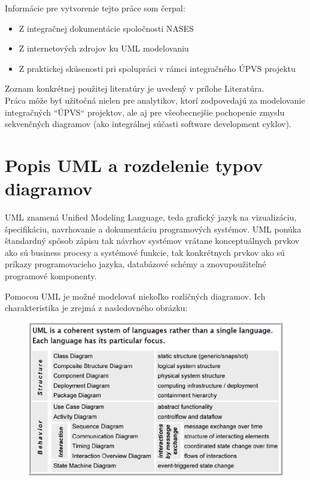 \documentclass[10pt,twoside,slovak,a4paper]{article}
\begin{document}
Informácie pre vytvorenie tejto práce som čerpal:

\begin{itemize}
\item Z integračnej dokumentácie spoločnosti NASES
\item Z internetových zdrojov ku UML modelovaniu
\item Z praktickej skúsenosti pri spolupráci v rámci integračného ÚPVS projektu
\end{itemize}
Zoznam konkrétnej použitej literatúry je uvedený v prílohe Literatúra.\\

Práca môže byť užitočná nielen pre analytikov, ktorí zodpovedajú za modelovanie integračných ``ÚPVS“ projektov, ale aj pre všeobecnejšie pochopenie zmyslu sekvenčných diagramov (ako integrálnej súčasti software development cyklov).


\section{Popis UML a rozdelenie typov diagramov} \label{2sek}

UML znamená Unified Modeling Language, teda grafický jazyk na vizualizáciu, špecifikáciu, navrhovanie a dokumentáciu programových systémov. 
\newpage
UML ponúka štandardný spôsob zápisu tak návrhov systémov vrátane konceptuálnych prvkov ako sú business procesy a systémové funkcie, tak konkrétnych prvkov ako sú príkazy programovacieho jazyka, databázové schémy a znovupoužiteľné programové komponenty.\cite{WIKI}\newline

Pomocou UML je možné modelovať niekoľko rozličných diagramov. Ich charakteristika je zrejmá z nasledovného obrázku\cite{UMLUni}:


\begin{figure}[h]
\centering
\includegraphics[width=\textwidth]{Images/Obr1.jpg}
\end{figure}
\end{document}
